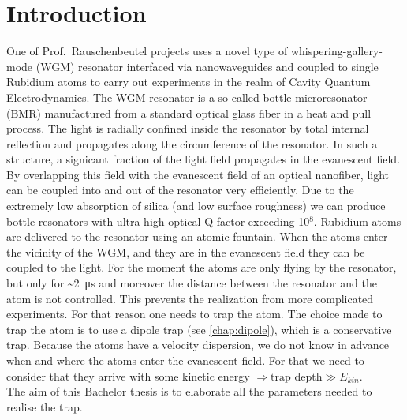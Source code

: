 
\chapter*{Introduction}

\ifpdf{}
    \graphicspath{{Introduction/Figs/Raster/}{Introduction/Figs/PDF/}{Introduction/Figs/}}
\else
    \graphicspath{{Introduction/Figs/Vector/}{Introduction/Figs/}}
\fi

One of Prof.\ Rauschenbeutel projects uses a novel type of whispering-gallery-mode (WGM)
resonator interfaced via nanowaveguides and coupled to single Rubidium atoms to carry out
experiments in the realm of Cavity Quantum Electrodynamics. The WGM resonator
is a so-called bottle-microresonator (BMR) manufactured from a standard optical glass
fiber in a heat and pull process. The light is radially confined inside the resonator by
total internal reflection and propagates along the circumference of the resonator. In such
a structure, a signicant fraction of the light field propagates in the evanescent field. By
overlapping this field with the evanescent field of an optical nanofiber, light can be coupled
into and out of the resonator very efficiently. Due to the extremely low absorption
of silica (and low surface roughness) we can produce bottle-resonators with ultra-high
optical Q-factor exceeding 10\(^{8}\). Rubidium atoms are delivered to the resonator using
an atomic fountain. When the atoms enter the vicinity of the WGM, and they are in the evanescent
field they can be coupled to the light. For the moment the atoms are only flying by the 
resonator, but only for \textasciitilde{}\SI{2}{\micro\second} and moreover the distance 
between the resonator and the atom is not controlled. This prevents the realization from 
more complicated experiments. For that reason one needs to trap the atom.
The choice made to trap the atom is to use a dipole trap (see \autoref{chap:dipole}), which
is a conservative trap. Because the atoms have a velocity dispersion, we do not know in
advance when and where the atoms enter the evanescent field. For that we need to consider that
they arrive with some kinetic energy \(\Rightarrow \text{trap depth} \gg E_{kin} \).\\
The aim of this Bachelor thesis is to elaborate all the parameters needed to realise the trap.
